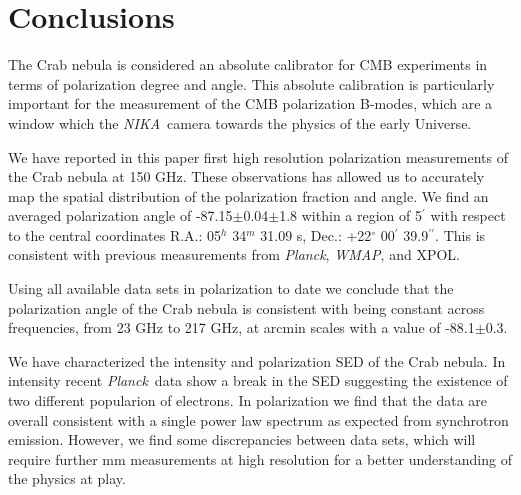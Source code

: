 \documentclass[twocolumn,traditabstract]{aa}
\def\NIKA{\textit{NIKA}}
\def\Planck{\textit{Planck}}
\def\WMAP{\textit{WMAP}}
\begin{document}



\section{Conclusions}\label{sec:conclusions}
The Crab nebula is considered an absolute calibrator for CMB experiments in terms of polarization degree and angle. This absolute calibration is particularly important for the measurement of the CMB polarization B-modes, which are a window which the \NIKA\ camera towards the physics of the early Universe.

We have reported in this paper first high resolution polarization measurements of the Crab nebula at 150 GHz. These observations has allowed us to accurately map the spatial distribution of the polarization fraction and angle. 
We find an averaged polarization angle of -87.15$\pm$0.04$\pm$1.8 within a region of 5$^\prime$ with respect to the central coordinates R.A.: 05$^{h}$ 34$^{m}$ 31.09 s, Dec.: +22$^{\circ}$ 00$^{\prime}$ 39.9$^{\prime\prime}$.
This is consistent with previous measurements from \Planck, \WMAP, and XPOL.

Using all available data sets in polarization to date we conclude that the polarization angle of the Crab nebula is consistent with being constant across frequencies, from 23 GHz to 217 GHz, at arcmin scales with a value of -88.1$\pm$0.3. 

We have characterized the intensity and polarization SED of the Crab nebula. 
In intensity recent \Planck\ data show a break in the SED suggesting the existence of two different popularion of electrons. In polarization we find that the data are overall consistent with a single power law spectrum as expected from synchrotron emission. However, we find some discrepancies between data sets, which will require further mm measurements at high resolution for a better understanding of the physics at play. 
\end{document}
